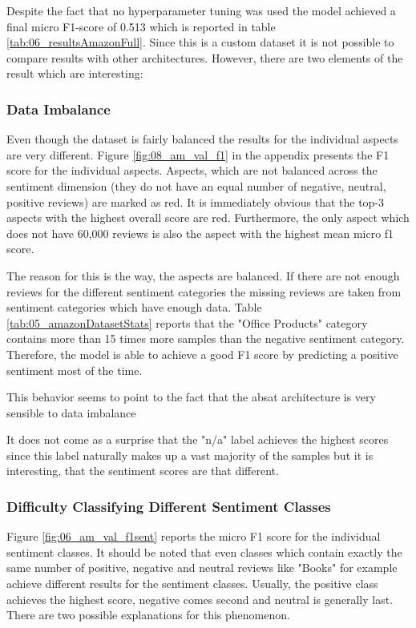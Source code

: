 Despite the fact that no hyperparameter tuning was used the model achieved a final micro F1-score of 0.513 which is reported in table \ref{tab:06_resultsAmazonFull}. Since this is a custom dataset it is not possible to compare results with other architectures. However, there are two elements of the result which are interesting:
\medskip

\subsubsection*{Data Imbalance}
Even though the dataset is fairly balanced the results for the individual aspects are very different. Figure \ref{fig:08_am_val_f1} in the appendix presents the F1 score for the individual aspects. Aspects, which are not balanced across the sentiment dimension {(they do not have an equal number of negative, neutral, positive reviews)} are marked as red. It is immediately obvious that the top-3 aspects with the highest overall score are red. Furthermore, the only aspect which does not have 60,000 reviews is also the aspect with the highest mean micro f1 score. 
\smallskip

The reason for this is the way, the aspects are balanced. If there are not enough reviews for the different sentiment categories the missing reviews are taken from sentiment categories which have enough data. Table \ref{tab:05_amazonDatasetStats} reports that the "Office Products" category contains more than 15 times more samples than the negative sentiment category. Therefore, the model is able to achieve a good F1 score by predicting a positive sentiment most of the time.
\smallskip

This behavior seems to point to the fact that the \gls{absat} architecture is very sensible to data imbalance


It does not come as a surprise that the "n/a" label achieves the highest scores since this label naturally makes up a vast majority of the samples but it is interesting, that the sentiment scores are that different.

\subsubsection*{Difficulty Classifying Different Sentiment Classes}

Figure \ref{fig:06_am_val_f1sent} reports the micro F1 score for the individual sentiment classes. It should be noted that even classes which contain exactly the same number of positive, negative and neutral reviews like "Books" for example achieve different results for the sentiment classes. Usually, the positive class achieves the highest score, negative comes second and neutral is generally last. There are two possible explanations for this phenomenon.
\smallskip

